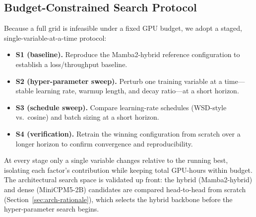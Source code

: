 \subsection{Budget-Constrained Search Protocol}\label{sec:search}
Because a full grid is infeasible under a fixed GPU budget, we adopt a staged, single-variable-at-a-time protocol:
\begin{itemize}
\item \textbf{S1 (baseline).} Reproduce the Mamba2-hybrid reference configuration to establish a loss/throughput baseline.
\item \textbf{S2 (hyper-parameter sweep).} Perturb one training variable at a time---stable learning rate, warmup length, and decay ratio---at a short horizon.
\item \textbf{S3 (schedule sweep).} Compare learning-rate schedules (WSD-style vs.\ cosine) and batch sizing at a short horizon.
\item \textbf{S4 (verification).} Retrain the winning configuration from scratch over a longer horizon to confirm convergence and reproducibility.
\end{itemize}

At every stage only a single variable changes relative to the running best, isolating each factor's contribution while keeping total GPU-hours within budget.
The architectural search space is validated up front: the hybrid (Mamba2-hybrid) and dense (MiniCPM5-2B) candidates are compared head-to-head from scratch (Section~\ref{sec:arch-rationale}), which selects the hybrid backbone before the hyper-parameter search begins.